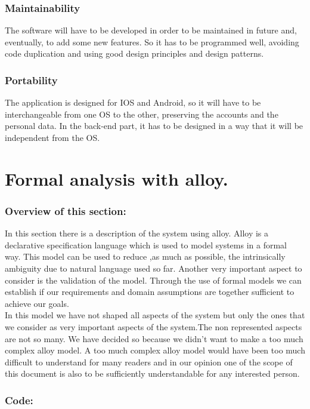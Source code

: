 \documentclass[titlepage]{article}
\begin{document}
\subsubsection{Maintainability}
The software will have to be developed in order to be maintained in future and, eventually, to add some new features.
So it has to be programmed well, avoiding code duplication and using good design principles and design patterns.

\subsubsection{Portability}

The application is designed for IOS and Android, so it will have to be interchangeable from one OS to the other, preserving the accounts and the personal data.
In the back-end part, it has to be designed in a way that it will be independent from the OS.


\section{Formal analysis with alloy.}
\subsubsection{Overview of this section:}
In this section there is a description of the system using alloy. Alloy is a declarative specification language which is used to model systems in a formal way. This model can be used to reduce ,as much as possible, the intrinsically ambiguity due to natural language used so far.
Another very important aspect to consider is the validation of the model. Through the use of formal models we can establish if our requirements and domain assumptions are together sufficient to achieve our goals.\\
In this model we have not shaped all aspects of the system but only the ones that we consider as very important aspects of the system.The non represented aspects are not so many. We have decided so because we didn't want to make a too much complex alloy model. A too much complex alloy model would have been too much difficult to understand for many readers and in our opinion one of the scope of this document is also to be sufficiently understandable for any interested person.

\subsubsection{Code:}

\end{document}
